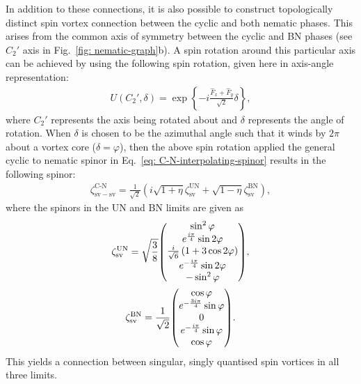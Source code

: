 In addition to these connections, it is also possible to construct topologically
distinct spin vortex connection between the cyclic and both nematic phases.
This arises from the common axis of symmetry between the cyclic and BN phases
(see \(C_2'\) axis in Fig.~\ref{fig: nematic-graph}b).
A spin rotation around this particular axis can be achieved by using the
following spin rotation, given here in axis-angle representation:
\begin{align}
    U(C_2', \delta) = \exp\left\{
        -i\frac{\hat{F}_x + \hat{F}_y}{\sqrt{2}}\delta
    \right\},
\end{align}
where \(C_2'\) represents the axis being rotated about and \(\delta\) represents
the angle of rotation.
When \(\delta\) is chosen to be the azimuthal angle such that it winds by
\(2\pi \) about a vortex core (\(\delta=\varphi\)), then the above spin rotation
applied the general cyclic to nematic spinor in
Eq.~\eqref{eq: C-N-interpolating-spinor} results in the following spinor:
\begin{align}
    \zeta^\text{C-N}_\mathrm{sv-sv} = \frac{1}{\sqrt{2}}\left(
    i\sqrt{1+\eta}\zeta^\mathrm{UN}_\mathrm{sv} +
    \sqrt{1-\eta}\zeta^\mathrm{BN}_\mathrm{sv}
    \right), \label{eq: C-BN-sv-sv}
\end{align}
where the spinors in the UN and BN limits are given as
\begin{gather}
    \zeta^\mathrm{UN}_\mathrm{sv} = \sqrt{\frac{3}{8}}
    \mqty(
    \sin^2 \varphi \\
    e^{\frac{i\pi }{4}} \sin 2\varphi \\
    \frac{i}{\sqrt{6}}\left(1 + 3\cos 2\varphi \right)\\
    e^{-\frac{i \pi }{4}} \sin2 \varphi \\
    -\sin^2 \varphi
    ), \\
    \zeta^\mathrm{BN}_\mathrm{sv} = \frac{1}{\sqrt{2}}
    \mqty(
    \cos \varphi \\
    e^{-\frac{3i\pi }{4}} \sin \varphi \\
    0\\
    e^{-\frac{i \pi }{4}} \sin \varphi \\
    \cos \varphi
    ).
\end{gather}
This yields a connection between singular, singly quantised spin vortices in all
three limits.

